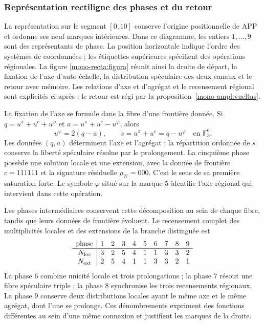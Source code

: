 \clearpage
\subsubsection{Représentation rectiligne des phases et du retour}
\label{mono-recta:desarrollo}

La représentation sur le segment \([0,10]\) conserve l’origine
positionnelle de APP et ordonne ses neuf marques intérieures. Dans ce diagramme,
les entiers \(1,\ldots,9\) sont des représentants de phase. La position
horizontale indique l’ordre des systèmes de coordonnées ; les étiquettes supérieures
spécifient des opérations régionales. La figure
\ref{mono-recta:figura} réunit ainsi la droite de départ, la fixation de
l’axe d’auto-échelle, la distribution spéculaire des deux canaux et le
retour avec mémoire. Les relations d’axe et d’agrégat et le recensement
régional sont explicités ci-après ; le retour est régi par la
proposition~\ref{mono-ampl:vueltas}.



La fixation de l'axe se formule dans la fibre d'une frontière donnée. Si
\(q=u^\pi+u^e+u^\varphi\) et
\(a=u^\pi+u^e-u^\varphi\), alors
\[
 u^\varphi=2(q-a),\qquad s=u^\pi+u^e=q-u^\varphi
 \quad\text{en }\mathbb F_3^6.
\]
Les données \((q,a)\) déterminent l'axe et l'agrégat ; la répartition ordonnée de \(s\) conserve la liberté spéculaire résolue par le prolongement. La cinquième phase possède une solution locale et une extension, avec la donnée de frontière \(c=111111\) et la signature résiduelle \(\rho_W=000\). C'est le sens de sa première saturation forte. Le symbole \(\varphi\) situé sur la marque \(5\) identifie l'axe régional qui intervient dans cette opération.

Les phases intermédiaires conservent cette décomposition au sein de chaque fibre,
tandis que leurs données de frontière évoluent. Le recensement complet des
multiplicités locales et des extensions de la branche distinguée est
\[
\begin{array}{c|rrrrrrrrr}
\text{phase}&1&2&3&4&5&6&7&8&9\\\hline
N_{\rm loc}&3&2&5&4&1&1&3&3&2\\
N_{\rm ext}&2&5&4&1&1&3&3&2&1
\end{array}
\]
La phase \(6\) combine unicité locale et trois prolongations ; la phase
\(7\) résout une fibre spéculaire triple ; la phase \(8\) synchronise
les trois recensements régionaux. La phase \(9\) conserve deux distributions
locales ayant le même axe et le même agrégat, dont l'une se
prolonge. Ces dénombrements expriment des fonctions différentes au sein d'une
même connexion et justifient les marques de la droite.

